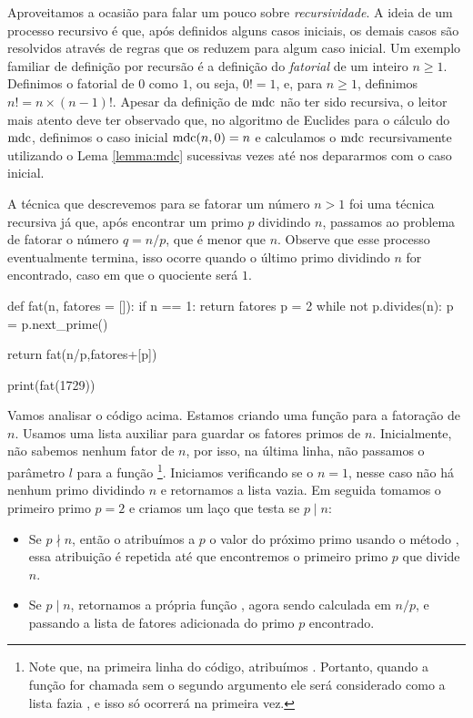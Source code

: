 Aproveitamos a ocasião para falar um pouco sobre
\emph{recursividade}. A
ideia de um processo recursivo é que,
após definidos alguns casos iniciais, os
demais casos são resolvidos através de regras
que os reduzem para algum caso inicial. Um exemplo familiar
de definição por recursão é a definição do
\emph{fatorial}
de um inteiro $n\geq 1$. Definimos o fatorial de $0$ como
$1$, ou seja, $0! = 1$, e,  para $n\geq 1$,
definimos $n! = n\times(n-1)!$. 
Apesar da definição de $\operatorname{mdc}$ não ter sido recursiva, o
leitor mais atento deve ter observado que,
no algoritmo de Euclides para o cálculo do $\operatorname{mdc}$,
definimos o caso inicial $\operatorname{mdc}(n,0) = n$ e calculamos
o $\operatorname{mdc}$ recursivamente utilizando
o Lema \ref{lemma:mdc} sucessivas vezes até 
nos depararmos com o caso inicial.

A técnica que descrevemos para se fatorar um número $n>1$
foi uma técnica recursiva já que, após encontrar
um primo $p$ dividindo $n$, passamos ao problema
de fatorar o número $q = n/p$, que é menor que $n$. Observe
que esse processo eventualmente termina, isso
ocorre quando o último primo
dividindo $n$ for encontrado, caso em que o quociente será $1$.

\begin{sageinput}
def fat(n, fatores = []):
    if n == 1:
        return fatores
    p = 2
    while  not p.divides(n):
        p = p.next_prime()
    
    return fat(n/p,fatores+[p])

print(fat(1729))
\end{sageinput}
\begin{sageoutput}
[7, 13, 19]
\end{sageoutput}
Vamos analisar o código acima. Estamos criando uma função para
a fatoração de $n$. Usamos uma lista auxiliar  para
guardar os fatores primos de $n$. Inicialmente, não sabemos
nenhum fator de $n$, por isso, na última linha, não passamos
o parâmetro $l$ para a função 
\footnote{Note que, na primeira linha do código, atribuímos 
. Portanto, quando a função for chamada
sem o segundo argumento ele será considerado como a lista
fazia \ils{[]}, e isso só ocorrerá na primeira vez.}.
Iniciamos verificando se o $n = 1$, nesse caso não
há nenhum primo dividindo $n$ e retornamos a lista vazia.
Em seguida tomamos o primeiro primo $p = 2$ e criamos
um laço  que testa se $p\mid n$:
\begin{itemize}
  \item Se $p\nmid n$, então
o atribuímos a $p$ o valor do próximo primo usando o
método , essa atribuição
é repetida até que encontremos o primeiro primo $p$
que divide $n$. 
  \item Se $p\mid n$, retornamos a própria
  função , agora sendo calculada
  em $n/p$, e passando a lista de fatores adicionada
  do primo $p$ encontrado.
\end{itemize}
 


